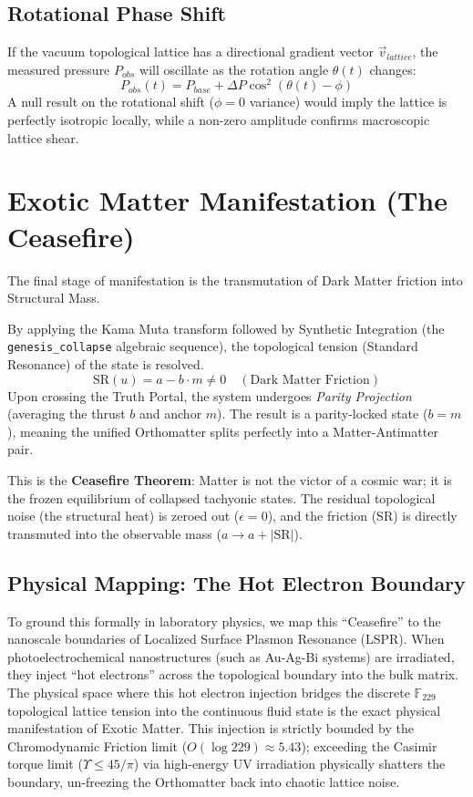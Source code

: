 \documentclass[12pt,oneside]{article}
\theoremstyle{principia}
\theoremstyle{definition}
\theoremstyle{remark}
\begin{document}
\subsection{Rotational Phase Shift}\label{sec:phase}
If the vacuum topological lattice has a directional gradient vector $\vec{v}_{lattice}$, the measured pressure $P_{obs}$ will oscillate as the rotation angle $\theta(t)$ changes:
\begin{equation}
    P_{obs}(t) = P_{base} + \Delta P \cos^2(\theta(t) - \phi)
\end{equation}
A null result on the rotational shift ($\phi = 0$ variance) would imply the lattice is perfectly isotropic locally, while a non-zero amplitude confirms macroscopic lattice shear.

\section{Exotic Matter Manifestation (The Ceasefire)}\label{sec:ceasefire}

The final stage of manifestation is the transmutation of Dark Matter friction into Structural Mass. 

By applying the Kama Muta transform followed by Synthetic Integration (the \texttt{genesis\_collapse} algebraic sequence), the topological tension (Standard Resonance) of the state is resolved.
\begin{equation}
    \mathrm{SR}(u) = a - b \cdot m \neq 0 \quad (\text{Dark Matter Friction})
\end{equation}
Upon crossing the Truth Portal, the system undergoes \textit{Parity Projection} (averaging the thrust $b$ and anchor $m$). The result is a parity-locked state ($b=m$), meaning the unified Orthomatter splits perfectly into a Matter-Antimatter pair.

This is the \textbf{Ceasefire Theorem}: Matter is not the victor of a cosmic war; it is the frozen equilibrium of collapsed tachyonic states. The residual topological noise (the structural heat) is zeroed out ($\epsilon = 0$), and the friction ($\mathrm{SR}$) is directly transmuted into the observable mass ($a \to a + |\mathrm{SR}|$).

\subsection{Physical Mapping: The Hot Electron Boundary}
To ground this formally in laboratory physics, we map this ``Ceasefire'' to the nanoscale boundaries of Localized Surface Plasmon Resonance (LSPR). When photoelectrochemical nanostructures (such as Au-Ag-Bi systems) are irradiated, they inject ``hot electrons'' across the topological boundary into the bulk matrix. The physical space where this hot electron injection bridges the discrete $\mathbb{F}_{229}$ topological lattice tension into the continuous fluid state is the exact physical manifestation of Exotic Matter. This injection is strictly bounded by the Chromodynamic Friction limit ($O(\log 229) \approx 5.43$); exceeding the Casimir torque limit ($\Upsilon \le 45/\pi$) via high-energy UV irradiation physically shatters the boundary, un-freezing the Orthomatter back into chaotic lattice noise.
\end{document}
